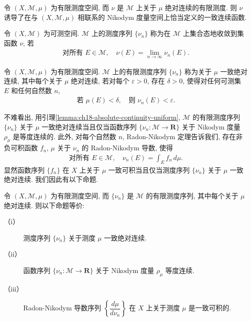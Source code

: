\documentclass[../../main.tex]{subfiles}
\begin{document}
\begin{proposition}\label{proposition:ch18-uniform-continuity}
令 $(X,\mathcal{M},\mu)$ 为有限测度空间, 而 $\nu$ 是 $\mathcal{M}$ 上关于 $\mu$ 绝对连续的有限测度. 则 $\nu$ 诱导了在与 $(X,\mathcal{M},\mu)$ 相联系的 Nikodym 度量空间上恰当定义的一致连续函数.
\end{proposition}

\begin{definition}[集合态收敛]\label{definition:ch18-setwise-convergence}
令 $(X,\mathcal{M})$ 为可测空间. $\mathcal{M}$ 上的测度序列 $\{\nu_{n}\}$ 称为在 $\mathcal{M}$ 上集合态地收敛到集函数 $\nu$, 若
\begin{align*}
\text{对所有 }E\in\mathcal{M},\quad\nu(E)=\lim_{n\to\infty}\nu_{n}(E).
\end{align*}
\end{definition}

\begin{definition}[一致绝对连续]\label{definition:ch18-uniform-abs-cont}
令 $(X,\mathcal{M},\mu)$ 为有限测度空间. $\mathcal{M}$ 上的有限测度序列 $\{\nu_{n}\}$ 称为关于 $\mu$ 一致绝对连续, 其中每个关于 $\mu$ 绝对连续, 若对每个 $\varepsilon>0$, 存在 $\delta>0$, 使得对任何可测集 $E$ 和任何自然数 $n$,
\begin{align*}
\text{若 }\mu(E)<\delta,\quad\text{则 }\nu_{n}(E)<\varepsilon.
\end{align*}
\end{definition}

不难看出, 用引理\cref{lemma:ch18-absolute-continuity-uniform}, $\mathcal{M}$ 的有限测度序列 $\{\nu_{n}\}$ 关于 $\mu$ 一致绝对连续当且仅当函数序列 $\{\nu_{n}:\mathcal{M}\to\mathbf{R}\}$ 关于 Nikodym 度量 $\rho_{\mu}$ 是等度连续的. 此外, 对每个自然数 $n$, Radon-Nikodym 定理告诉我们, 存在非负可积函数 $f_{n}$, $\mu$ 关于 $\nu_{n}$ 的 Radon-Nikodym 导数, 使得
\begin{align*}
\text{对所有 }E\in\mathcal{M},\quad\nu_{n}(E)=\int_{E}f_{n}\,d\mu.
\end{align*}
显然函数序列 $\{f_{n}\}$ 在 $X$ 上关于 $\mu$ 一致可积当且仅当测度序列 $\{\nu_{n}\}$ 关于 $\mu$ 一致绝对连续. 我们因此有以下命题.

\begin{proposition}\label{proposition:ch18-uniform-integrability-equivalence}
令 $(X,\mathcal{M},\mu)$ 为有限测度空间, 而 $\{\nu_{n}\}$ 是 $\mathcal{M}$ 的有限测度序列, 其中每个关于 $\mu$ 绝对连续. 则以下命题等价:
\begin{description}
\item[（i）] 测度序列 $\{\nu_{n}\}$ 关于测度 $\mu$ 一致绝对连续.
\item[（ii）] 函数序列 $\{\nu_{n}:\mathcal{M}\to\mathbf{R}\}$ 关于 Nikodym 度量 $\rho_{\mu}$ 等度连续.
\item[（iii）] Radon-Nikodym 导数序列 $\left\{\dfrac{d\mu}{d\nu_{n}}\right\}$ 在 $X$ 上关于测度 $\mu$ 是一致可积的.
\end{description}
\end{proposition}
\end{document}
